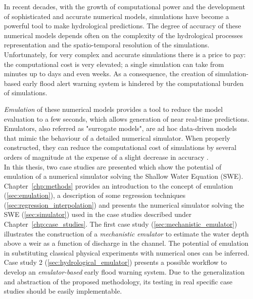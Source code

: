 In recent decades, with the growth of computational power and the development of sophisticated and accurate numerical models, simulations have become a powerful tool to make hydrological predictions. 
The degree of accuracy of these numerical models depends often on the complexity of the hydrological processes representation and the spatio-temporal resolution of the simulations. Unfortunately, for very complex and accurate simulations there is a price to pay: the computational cost is very elevated; a single simulation can take from  minutes up to days and even weeks. As a consequence, the creation of simulation-based early flood alert warning system is hindered by the computational burden of simulations. 

\emph{Emulation} of these numerical models provides a tool to reduce the model evaluation to a few seconds, which allows generation of near real-time predictions.
Emulators, also referred as "surrogate models", are ad hoc data-driven models that mimic the behaviour of a detailed numerical simulator. When properly constructed, they can reduce the computational cost of simulations by several orders of magnitude at the expense of a slight decrease in accuracy \autocite{carbajal_appraisal_2016}.\\

In this thesis, two case studies are presented which show the potential of emulation of a numerical simulator solving the Shallow Water Equation (SWE). 
Chapter~\ref{chp:methods} provides an introduction to the concept of emulation (\ref{sec:emulation}), a description of some regression techniques (\ref{sec:regression_interpolation}) and presents the numerical simulator solving the SWE (\ref{sec:simulator}) used in the case studies described under Chapter~\ref{chp:case_studies}.
The first case study (\ref{sec:mechanistic_emulator}) illustrates the construction of a \emph{mechanistic emulator} to estimate the water depth above a weir as a function of discharge in the channel.
The potential of emulation in substituting classical physical experiments with numerical ones can be inferred.
Case study 2 (\ref{sec:hydrological_emulator}) presents a possible workflow to develop an \emph{emulator-based} early flood warning system. 
Due to the generalization and abstraction of the proposed methodology, its testing in real specific case studies should be easily implementable.\\



